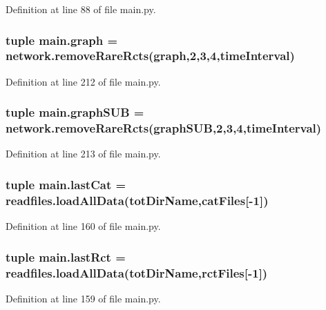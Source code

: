 Definition at line 88 of file main.\-py.

\hypertarget{a00151_a4cfdc01ecc5ad260a4f30c9353e3d856}{
\subsubsection[{graph}]{\setlength{\rightskip}{0pt plus 5cm}tuple main.\-graph = network.\-remove\-Rare\-Rcts(graph,2,3,4,{\bf time\-Interval})}}\label{a00151_a4cfdc01ecc5ad260a4f30c9353e3d856}


Definition at line 212 of file main.\-py.

\hypertarget{a00151_ab96de87bc8cbe59221256af996bdc43e}{
\subsubsection[{graph\-S\-U\-B}]{\setlength{\rightskip}{0pt plus 5cm}tuple main.\-graph\-S\-U\-B = network.\-remove\-Rare\-Rcts(graph\-S\-U\-B,2,3,4,{\bf time\-Interval})}}\label{a00151_ab96de87bc8cbe59221256af996bdc43e}


Definition at line 213 of file main.\-py.

\hypertarget{a00151_a1d69cc4251d83bb227555044baf27b86}{
\subsubsection[{last\-Cat}]{\setlength{\rightskip}{0pt plus 5cm}tuple main.\-last\-Cat = readfiles.\-load\-All\-Data({\bf tot\-Dir\-Name},{\bf cat\-Files}\mbox{[}-\/1\mbox{]})}}\label{a00151_a1d69cc4251d83bb227555044baf27b86}


Definition at line 160 of file main.\-py.

\hypertarget{a00151_ad9cee9fada504bb0dab86df3a416232b}{
\subsubsection[{last\-Rct}]{\setlength{\rightskip}{0pt plus 5cm}tuple main.\-last\-Rct = readfiles.\-load\-All\-Data({\bf tot\-Dir\-Name},{\bf rct\-Files}\mbox{[}-\/1\mbox{]})}}\label{a00151_ad9cee9fada504bb0dab86df3a416232b}


Definition at line 159 of file main.\-py.

